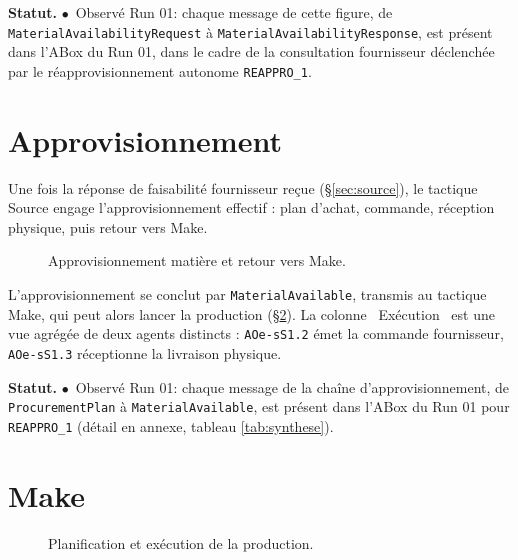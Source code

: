 \documentclass[11pt,a4paper]{article}
\newcommand{\code}[1]{\texttt{#1}}
\newcommand{\stRUN}{\ensuremath{\bullet}~Observé Run 01}
\newcommand{\statut}[1]{\textbf{Statut.} #1}
\begin{document}
\statut{\stRUN : chaque message de cette figure, de \code{MaterialAvailabilityRequest} à \code{MaterialAvailabilityResponse}, est présent dans l'ABox du Run 01, dans le cadre de la consultation fournisseur déclenchée par le réapprovisionnement autonome \code{REAPPRO\_1}.}

\section{Approvisionnement}
\label{sec:approvisionnement}

Une fois la réponse de faisabilité fournisseur reçue (\S\ref{sec:source}), le tactique Source engage l'approvisionnement effectif : plan d'achat, commande, réception physique, puis retour vers Make.

\begin{landscape}
\begin{figure}[p]
\centering
\resizebox{\linewidth}{!}{}
\caption{Approvisionnement matière et retour vers Make.}
\label{fig:seq04}
\end{figure}
\end{landscape}

L'approvisionnement se conclut par \code{MaterialAvailable}, transmis au tactique Make, qui peut alors lancer la production (\S\ref{sec:make}). La colonne \og{}~Exécution~\fg{} est une vue agrégée de deux agents distincts : \code{AOe-sS1.2} émet la commande fournisseur, \code{AOe-sS1.3} réceptionne la livraison physique.

\statut{\stRUN : chaque message de la chaîne d'approvisionnement, de \code{ProcurementPlan} à \code{MaterialAvailable}, est présent dans l'ABox du Run 01 pour \code{REAPPRO\_1} (détail en annexe, tableau \ref{tab:synthese}).}

\section{Make}
\label{sec:make}

\begin{figure}[H]
\centering
\resizebox{\textwidth}{!}{}
\caption{Planification et exécution de la production.}
\label{fig:seq05}
\end{figure}
\end{document}
